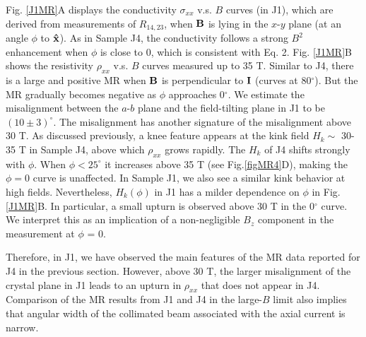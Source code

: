 Fig. \ref{J1MR}A displays the conductivity $\sigma_{xx}$ v.s. $B$ curves (in J1), which are derived from measurements of $R_{14,23}$, when $\bf B$ is lying in the $x$-$y$ plane (at an angle $\phi$ to $\bf\hat{x}$). As in Sample J4, the conductivity follows a strong $B^2$ enhancement when $\phi$ is close to 0, which is consistent with Eq. 2. Fig. \ref{J1MR}B shows the resistivity $\rho_{xx}$ v.s. $B$ curves measured up to 35 T. Similar to J4, there is a large and positive MR when $\bf B$ is perpendicular to $\bf I$ (curves at 80$^\circ$). But the MR gradually becomes negative as $\phi$ approaches 0$^\circ$. We estimate the misalignment between the $a$-$b$ plane and the field-tilting plane in J1 to be $(10\pm 3)^\circ$. The misalignment has another signature of the misalignment above 30 T. As discussed previously, a knee feature appears at the kink field $H_k\sim$ 30-35 T in Sample J4, above which $\rho_{xx}$ grows rapidly. The $H_k$ of J4 shifts strongly with $\phi$. When $\phi < 25^\circ$ it increases above 35 T (see Fig.\ref{figMR4}D), making the $\phi=0$ curve is unaffected. In Sample J1, we also see a similar kink behavior at high fields. Nevertheless, $H_k(\phi)$ in J1 has a milder dependence on $\phi$ in Fig. \ref{J1MR}B. In particular, a small upturn is observed above 30 T in the 0$^\circ$ curve. We interpret this as an implication of a non-negligible $B_z$ component in the measurement at $\phi$ = 0. 

Therefore, in J1, we have observed the main features of the MR data reported for J4 in the previous section. However, above 30 T, the larger misalignment of the crystal plane in J1 leads to an upturn in $\rho_{xx}$ that does not appear in J4. Comparison of the MR results from J1 and J4 in the large-$B$ limit also implies that angular width of the collimated beam associated with the axial current is narrow. 





